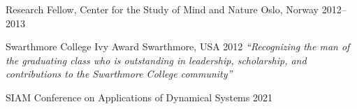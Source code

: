 

\begin{cventries}


  {Research Fellow, Center for the Study of Mind and Nature} %
  {Oslo, Norway} %
  {2012--2013} %
  {}

  \cventry
    {Swarthmore College} %
    {Ivy Award} %
    {Swarthmore, USA} %
    {2012} %
    {\emph{``Recognizing the man of the graduating class who is outstanding in leadership, scholarship, and contributions to the Swarthmore College community''}}
    
\end{cventries}




\begin{cvhonors}
    
  \cvhonorminor
      {} %
      {SIAM Conference on Applications of Dynamical Systems} %
      {} %
      {2021} %

\end{cvhonors}




